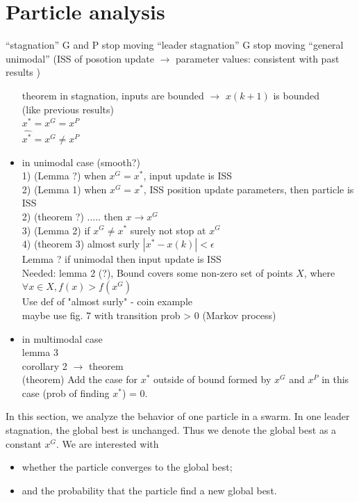 \section{Particle analysis}
\label{sec:particle}

``stagnation'' G and P stop moving
``leader stagnation'' G stop moving
``general unimodal'' (ISS of posotion update $ \rightarrow $ parameter values: consistent with past results )
\begin{itemize}
\item [theorem] in stagnation, inputs are bounded $ \rightarrow $ $ x(k+1) $ is bounded \\
(like previous results) \\
$  x^{*} = x^{G} = x^{P} $ \\
$  \hat{x^{*}} = x^{G} \not = x^{P} $
\item in unimodal case (smooth?)  \\
1) (Lemma ?) when $ x^{G} = x^{*} $, input update is ISS \\
2) (Lemma 1) when $ x^{G} = x^{*} $, ISS position update parameters, then particle is ISS \\
2) (theorem ?) ..... then $ x \rightarrow x^{G} $ \\
3) (Lemma 2) if $ x^{G} \not = x^{*} $ surely not stop at $ x^{G} $ \\
4) (theorem 3) almost surly $ | x^{*} - x(k) | < \epsilon $ \\
Lemma ? if unimodal then input update is ISS \\
Needed: lemma 2 (?), Bound covers some non-zero set of points $ X $, where $ \forall x \in X, f(x) > f(x^{G}) $ \\
Use def of "almost surly" - coin example \\
maybe use fig. 7 with transition prob > 0 (Markov process) 
\item in multimodal case \\
lemma 3 \\
corollary 2 $ \rightarrow $ theorem \\
(theorem) Add the case for $ x^{*} $ outside of bound formed by $ x^{G} $ and $ x^{P} $ in this case (prob of finding $ x^{*} $) = 0.
\end{itemize}

In this section, we analyze the behavior of one particle in a swarm.
In one leader stagnation, the global best is unchanged.
Thus we denote the global best as a constant $ x^{G} $.
We are interested with 
\begin{itemize}
\item whether the particle converges to the global best;
\item and the probability that the particle find a new global best.
\end{itemize}

